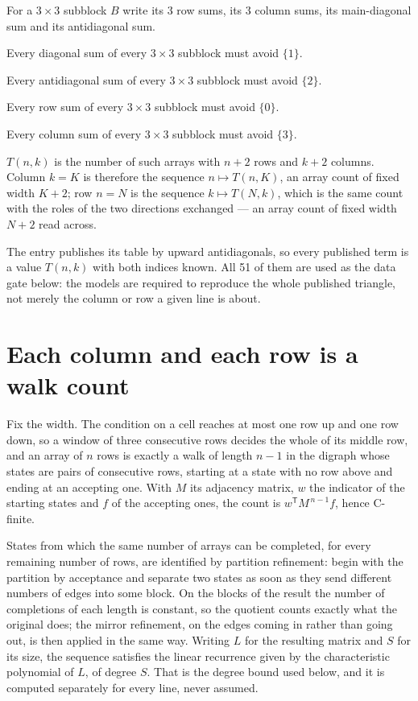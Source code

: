 \documentclass[11pt]{article}
\theoremstyle{definition}
\begin{document}
For a $3\times3$ subblock $B$ write its 3 row sums, its 3 column sums, its main-diagonal sum and its antidiagonal sum.

Every diagonal sum of every $3\times3$ subblock must avoid $\{1\}$.

Every antidiagonal sum of every $3\times3$ subblock must avoid $\{2\}$.

Every row sum of every $3\times3$ subblock must avoid $\{0\}$.

Every column sum of every $3\times3$ subblock must avoid $\{3\}$.

$T(n,k)$ is the number of such arrays with $n + 2$ rows and $k + 2$ columns. Column $k = K$ is therefore the sequence $n \mapsto T(n,K)$, an array count of fixed width $K + 2$; row $n = N$ is the sequence $k \mapsto T(N,k)$, which is the same count with the roles of the two directions exchanged --- an array count of fixed width $N + 2$ read across.

The entry publishes its table by upward antidiagonals, so every published term is a value $T(n,k)$ with both indices known. All 51 of them are used as the data gate below: the models are required to reproduce the whole published triangle, not merely the column or row a given line is about.

\section{Each column and each row is a walk count}

Fix the width. The condition on a cell reaches at most one row up and one row down, so a window of three consecutive rows decides the whole of its middle row, and an array of $n$ rows is exactly a walk of length $n-1$ in the digraph whose states are pairs of consecutive rows, starting at a state with no row above and ending at an accepting one. With $M$ its adjacency matrix, $w$ the indicator of the starting states and $f$ of the accepting ones, the count is $w^{\mathsf T}M^{\,n-1}f$, hence C-finite.

States from which the same number of arrays can be completed, for every remaining number of rows, are identified by partition refinement: begin with the partition by acceptance and separate two states as soon as they send different numbers of edges into some block. On the blocks of the result the number of completions of each length is constant, so the quotient counts exactly what the original does; the mirror refinement, on the edges coming in rather than going out, is then applied in the same way. Writing $L$ for the resulting matrix and $S$ for its size, the sequence satisfies the linear recurrence given by the characteristic polynomial of $L$, of degree $S$. That is the degree bound used below, and it is computed separately for every line, never assumed.
\end{document}
